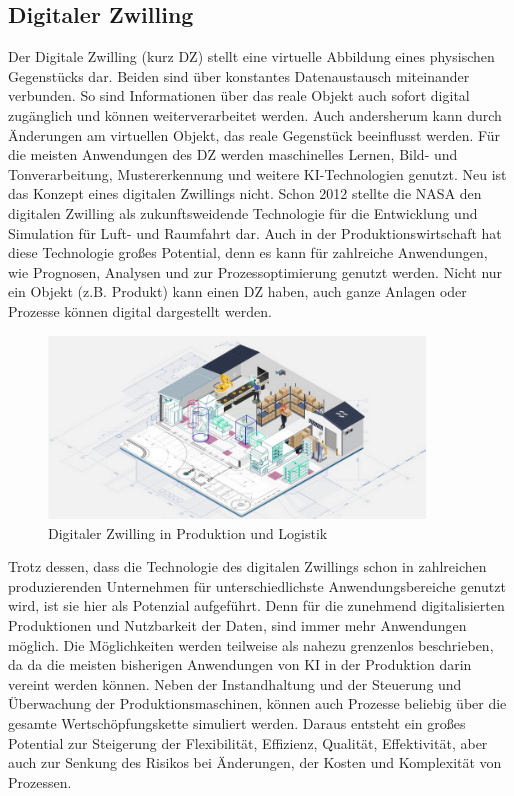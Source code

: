 \documentclass[a4paper,12pt, german]{report}
\begin{document}
\subsection{Digitaler Zwilling}
Der Digitale Zwilling (kurz DZ) stellt eine virtuelle Abbildung eines physischen Gegenstücks dar. Beiden sind über konstantes Datenaustausch miteinander verbunden. So sind Informationen über das reale Objekt auch sofort digital zugänglich und können weiterverarbeitet werden. Auch andersherum kann durch Änderungen am virtuellen Objekt, das reale Gegenstück beeinflusst werden. Für die meisten Anwendungen des DZ werden maschinelles Lernen, Bild- und Tonverarbeitung, Mustererkennung und weitere KI-Technologien genutzt.
Neu ist das Konzept eines digitalen Zwillings nicht. Schon 2012 stellte die NASA den digitalen Zwilling als zukunftsweidende Technologie für die Entwicklung und Simulation für Luft- und Raumfahrt dar. Auch in der Produktionswirtschaft hat diese Technologie großes Potential, denn es kann für zahlreiche Anwendungen, wie Prognosen, Analysen und zur Prozessoptimierung genutzt werden. Nicht nur ein Objekt (z.B. Produkt) kann einen DZ haben, auch ganze Anlagen oder Prozesse können digital dargestellt werden. \cite{32}

\begin{figure}[H]
  \center
 \includegraphics[width=10cm]{images/DZ.png}
  \caption[Digitaler Zwilling in Produktion und Logistik]{Digitaler Zwilling in Produktion und Logistik \cite{34}}
\end{figure}

Trotz dessen, dass die Technologie des digitalen Zwillings schon in zahlreichen produzierenden Unternehmen für unterschiedlichste Anwendungsbereiche genutzt wird, ist sie hier als Potenzial aufgeführt. Denn für die zunehmend digitalisierten Produktionen und Nutzbarkeit der Daten, sind immer mehr Anwendungen möglich. Die Möglichkeiten werden teilweise als nahezu grenzenlos beschrieben, da da die meisten bisherigen Anwendungen von KI in der Produktion darin vereint werden können. Neben der Instandhaltung und der Steuerung und Überwachung der Produktionsmaschinen, können auch Prozesse beliebig über die gesamte Wertschöpfungskette simuliert werden. Daraus entsteht ein großes Potential zur Steigerung der Flexibilität, Effizienz, Qualität, Effektivität, aber auch zur Senkung des Risikos bei Änderungen, der Kosten und Komplexität von Prozessen.\cite{33}
\end{document}
